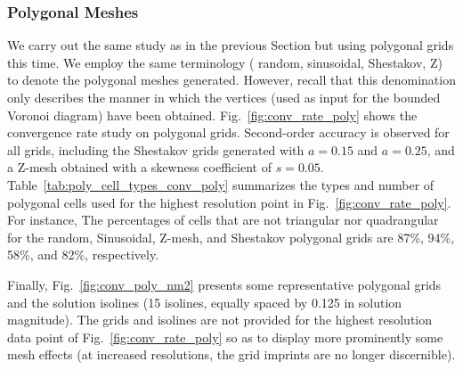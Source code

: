 \documentclass[preprint,10pt]{elsarticle}
\newcommand{\fig}[1]{Fig.~\ref{#1}}                      %
\newcommand{\tbl}[1]{Table~\ref{#1}}                     %
\begin{document}
\subsubsection{Polygonal Meshes} \label{sec:results_conv_poly}

We carry out the same study as in the previous Section but using polygonal grids this time. We employ the same terminology (
random, sinusoidal, Shestakov, Z) to denote the polygonal meshes generated. However, recall that this denomination
only describes the manner in which the vertices (used as input for the bounded Voronoi diagram) have been obtained.
%
\fig{fig:conv_rate_poly} shows the convergence rate study on polygonal grids. Second-order accuracy is observed for all 
grids, including the Shestakov grids generated with $a=0.15$ and $a=0.25$, and a Z-mesh obtained with a skewness 
coefficient of $s=0.05$.
\tbl{tab:poly_cell_types_conv_poly} summarizes the types and number of polygonal cells used for the highest resolution point in 
\fig{fig:conv_rate_poly}. For instance, The percentages of cells that are not triangular nor quadrangular for the random, Sinusoidal, 
Z-mesh, and Shestakov polygonal grids are 87\%, 94\%, 58\%, and 82\%, respectively.

Finally, \fig{fig:conv_poly_nm2} presents some representative polygonal grids and the solution isolines (15 isolines, equally spaced by 0.125 in solution magnitude). The grids and isolines are not provided for the highest resolution data point of \fig{fig:conv_rate_poly} so as to display more prominently some mesh effects (at increased resolutions, the grid imprints are no longer discernible).
\end{document}
